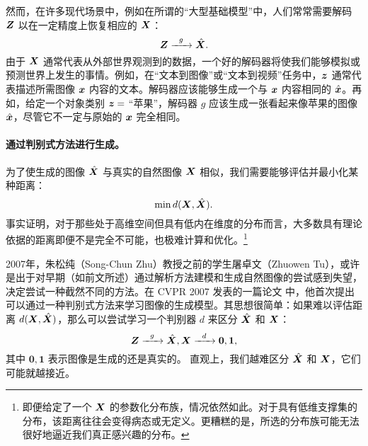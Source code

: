 \documentclass[../../book-main_zh.tex]{subfiles}
\begin{document}
然而，在许多现代场景中，例如在所谓的“大型基础模型”中，人们常常需要解码 $\bm{Z}$ 以在一定精度上恢复相应的 $\bm{X}$：
\begin{equation}
    \bm{Z}   \xrightarrow{\hspace{2mm} g  \hspace{2mm}} \hat {\bm{X}}.
       \label{eqn:decoding-deep-networks}
\end{equation}
由于 $\bm{X}$ 通常代表从外部世界观测到的数据，一个好的解码器将使我们能够模拟或预测世界上发生的事情。例如，在“文本到图像”或“文本到视频”任务中，$\bm{z}$ 通常代表描述所需图像 $\bm{x}$ 内容的文本。解码器应该能够生成一个与 $\bm{x}$ 内容相同的 $\hat {\bm{x}}$。再如，给定一个对象类别 $\bm{z} = $ “苹果”，解码器 $g$ 应该生成一张看起来像苹果的图像 $\hat {\bm{x}}$，尽管它不一定与原始的 $\bm{x}$ 完全相同。 



\paragraph{通过判别式方法进行生成。}

为了使生成的图像 $\hat {\bm{X}}$ 与真实的自然图像 $\bm{X}$ 相似，我们需要能够评估并最小化某种距离：
\begin{equation}
    \min d(\bm{X}, \hat {\bm{X}}).
\end{equation}
事实证明，对于那些处于高维空间但具有低内在维度的分布而言，大多数具有理论依据的距离即便不是完全不可能，也极难计算和优化。\footnote{即便给定了一个 $\bm{X}$ 的参数化分布族，情况依然如此。对于具有低维支撑集的分布，该距离往往会变得病态或无定义。更糟糕的是，所选的分布族可能无法很好地逼近我们真正感兴趣的分布。} 

2007年，朱松纯（Song-Chun Zhu）教授之前的学生屠卓文（Zhuowen Tu），或许是出于对早期（如前文所述）通过解析方法建模和生成自然图像的尝试感到失望，决定尝试一种截然不同的方法。在 CVPR 2007 发表的一篇论文 \cite{Tu-2007} 中，他首次提出可以通过一种判别式方法来学习图像的生成模型。其思想很简单：如果难以评估距离 $d(\bm{X}, \hat {\bm{X}})$，那么可以尝试学习一个判别器 $d$ 来区分 $\hat {\bm{X}}$ 和 $\bm{X}$：
\begin{equation}
    \bm{Z}   \xrightarrow{\hspace{2mm} g  \hspace{2mm}} \hat {\bm{X}}, \bm{X} \xrightarrow{\hspace{2mm} d  \hspace{2mm}} \boldsymbol{0}, \boldsymbol{1},
       \label{eqn:gan-networks}
\end{equation}
其中 $\boldsymbol{0}, \boldsymbol{1}$ 表示图像是生成的还是真实的。
直观上，我们越难区分 $\hat {\bm{X}}$ 和 $\bm{X}$，它们可能就越接近。
\end{document}

